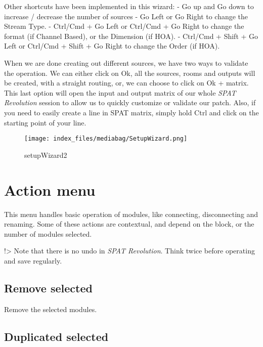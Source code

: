 \documentclass[
  letterpaper,
  DIV=11,
  numbers=noendperiod]{scrreport}
\begin{document}
Other shortcuts have been implemented in this wizard: - Go up and Go
down to increase / decrease the number of sources - Go Left or Go Right
to change the Stream Type. - Ctrl/Cmd + Go Left or Ctrl/Cmd + Go Right
to change the format (if Channel Based), or the Dimension (if HOA). -
Ctrl/Cmd + Shift + Go Left or Ctrl/Cmd + Shift + Go Right to change the
Order (if HOA).

When we are done creating out different sources, we have two ways to
validate the operation. We can either click on Ok, all the sources,
rooms and outputs will be created, with a straight routing, or, we can
choose to click on Ok + matrix. This last option will open the input and
output matrix of our whole \emph{SPAT Revolution} session to allow us to
quickly customize or validate our patch. Also, if you need to easily
create a line in SPAT matrix, simply hold Ctrl and click on the starting
point of your line.

\begin{figure}

{\centering \texttt{[image: index\_files/mediabag/SetupWizard.png]}

}

\caption{setupWizard2}

\end{figure}

\hypertarget{action-menu}{%
\section{Action menu}\label{action-menu}}

This menu handles basic operation of modules, like connecting,
disconnecting and renaming. Some of these actions are contextual, and
depend on the block, or the number of modules selected.

!\textgreater{} Note that there is no undo in \emph{SPAT Revolution}.
Think twice before operating and save regularly.

\hypertarget{remove-selected}{%
\subsection{Remove selected}\label{remove-selected}}

Remove the selected modules.

\hypertarget{duplicated-selected}{%
\subsection{Duplicated selected}\label{duplicated-selected}}
\end{document}
